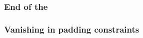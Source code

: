 \subsubsection{End of the \romColumnCfi{}}                                                               \label{rom: generalities: end of cfi}                   
\subsubsection{Vanishing in padding constraints}                                                \label{rom: generalities: vanishing in padding}         

